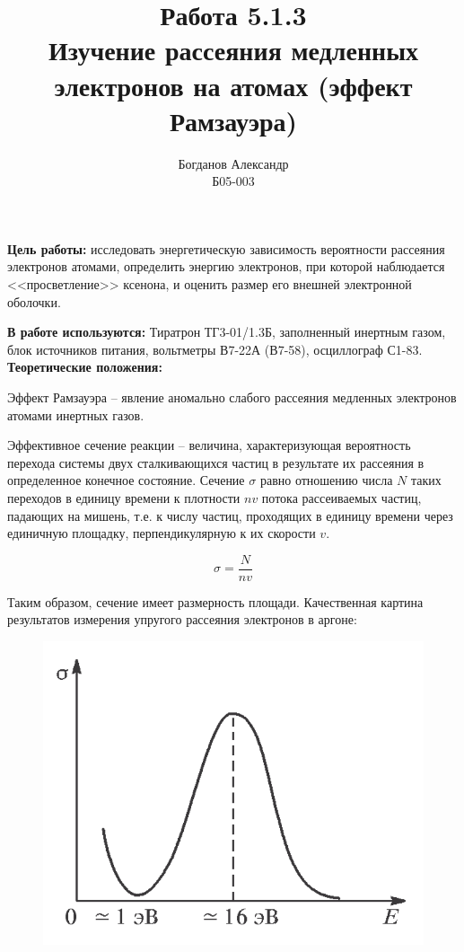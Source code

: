 \documentclass[a4paper, 12pt]{article}%
\author{Богданов Александр \\
	Б05-003}
\title{\textbf{Работа 5.1.3 \\ 
		Изучение рассеяния медленных электронов на атомах (эффект Рамзауэра)}}
\begin{document}
\maketitle

\textbf{Цель работы:} исследовать энергетическую зависимость вероятности рассеяния электронов атомами,  определить энергию электронов,  при которой наблюдается <<просветление>> ксенона,  и оценить размер его внешней электронной оболочки.

\textbf{В работе используются:} Тиратрон ТГ3-01/1.3Б,  заполненный инертным газом,  блок источников питания, вольтметры В7-22А (В7-58),  осциллограф С1-83.
\\

\textbf{Теоретические положения:}\\\par

	Эффект Рамзауэра -- явление аномально слабого рассеяния медленных электронов атомами инертных газов. 

	Эффективное сечение реакции --  величина,  характеризующая вероятность перехода системы двух сталкивающихся частиц в результате их рассеяния  в определенное конечное состояние.  Сечение $\sigma$ равно отношению числа $N$ таких переходов в единицу времени к плотности $nv$ потока рассеиваемых частиц, падающих на мишень, т.е. к числу частиц, проходящих в единицу времени через единичную площадку, перпендикулярную к их скорости $v$.

\[ \sigma = \dfrac{N}{nv}\]

	Таким образом, сечение имеет размерность площади. Качественная картина результатов измерения упругого рассеяния электронов в аргоне:

	\begin{figure}[h!]
		\centering
		\includegraphics[scale=0.3]{График_1.PNG}
	\end{figure}
\end{document}
